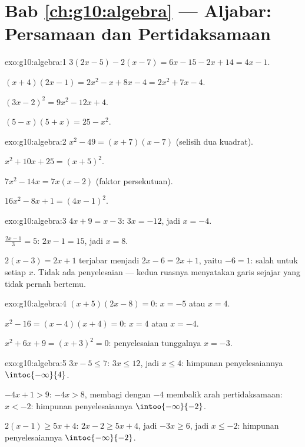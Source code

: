 \section*{Bab \ref{ch:g10:algebra} --- Aljabar: Persamaan dan Pertidaksamaan}

\begin{solution}{exo:g10:algebra:1}
$3(2x-5) - 2(x-7) = 6x - 15 - 2x + 14 = 4x - 1$.

$(x+4)(2x-1) = 2x^2 - x + 8x - 4 = 2x^2 + 7x - 4$.

$(3x-2)^2 = 9x^2 - 12x + 4$.

$(5-x)(5+x) = 25 - x^2$.
\end{solution}

\begin{solution}{exo:g10:algebra:2}
$x^2 - 49 = (x+7)(x-7)$ (selisih dua kuadrat).

$x^2 + 10x + 25 = (x+5)^2$.

$7x^2 - 14x = 7x(x - 2)$ (faktor persekutuan).

$16x^2 - 8x + 1 = (4x - 1)^2$.
\end{solution}

\begin{solution}{exo:g10:algebra:3}
$4x + 9 = x - 3$: $3x = -12$, jadi $x = -4$.

$\frac{2x-1}{3} = 5$: $2x - 1 = 15$, jadi $x = 8$.

$2(x-3) = 2x + 1$ terjabar menjadi $2x - 6 = 2x + 1$, yaitu $-6 = 1$: salah
untuk setiap $x$. Tidak ada penyelesaian --- kedua ruasnya menyatakan garis
sejajar yang tidak pernah bertemu.
\end{solution}

\begin{solution}{exo:g10:algebra:4}
$(x+5)(2x-8) = 0$: $x = -5$ atau $x = 4$.

$x^2 - 16 = (x-4)(x+4) = 0$: $x = 4$ atau $x = -4$.

$x^2 + 6x + 9 = (x+3)^2 = 0$: penyelesaian tunggalnya $x = -3$.
\end{solution}

\begin{solution}{exo:g10:algebra:5}
$3x - 5 \leq 7$: $3x \leq 12$, jadi $x \leq 4$: himpunan penyelesaiannya
$\intoc{-\infty}{4}$.

$-4x + 1 > 9$: $-4x > 8$, membagi dengan $-4$ membalik arah pertidaksamaan:
$x < -2$: himpunan penyelesaiannya $\intoo{-\infty}{-2}$.

$2(x-1) \geq 5x + 4$: $2x - 2 \geq 5x + 4$, jadi $-3x \geq 6$, jadi
$x \leq -2$: himpunan penyelesaiannya $\intoc{-\infty}{-2}$.
\end{solution}

